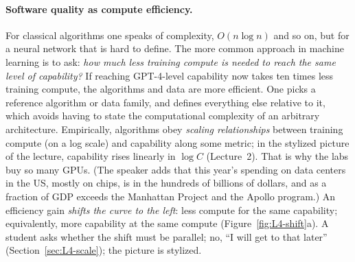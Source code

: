 \paragraph{Software quality as compute efficiency.}
For classical algorithms one speaks of complexity, $O(n\log n)$ and so on, but for a neural network that is hard to define. The more common approach in machine learning is to ask: \emph{how much less training compute is needed to reach the same level of capability?} If reaching GPT-4-level capability now takes ten times less training compute, the algorithms and data are more efficient. One picks a reference algorithm or data family, and defines everything else relative to it, which avoids having to state the computational complexity of an arbitrary architecture.
Empirically, algorithms obey \emph{scaling relationships} between training compute (on a log scale) and capability along some metric; in the stylized picture of the lecture, capability rises linearly in $\log C$ (Lecture~2). That is why the labs buy so many GPUs. (The speaker adds that this year's spending on data centers in the US, mostly on chips, is in the hundreds of billions of dollars, and as a fraction of GDP exceeds the Manhattan Project and the Apollo program\flag.)
An efficiency gain \emph{shifts the curve to the left}: less compute for the same capability; equivalently, more capability at the same compute (Figure~\ref{fig:L4-shift}a). A student asks whether the shift must be parallel; no, ``I will get to that later'' (Section~\ref{sec:L4-scale}); the picture is stylized.

